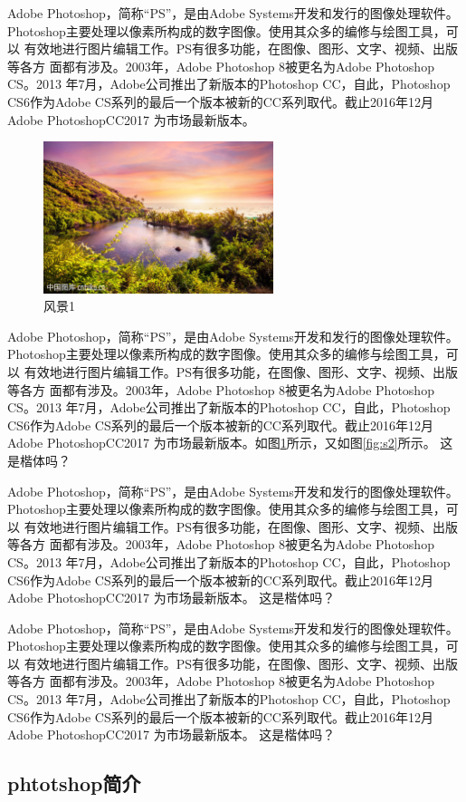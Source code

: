   Adobe Photoshop，简称“PS”，是由Adobe Systems开发和发行的图像处理软件。
 Photoshop主要处理以像素所构成的数字图像。使用其众多的编修与绘图工具，可以
 有效地进行图片编辑工作。PS有很多功能，在图像、图形、文字、视频、出版等各方
 面都有涉及。2003年，Adobe Photoshop 8被更名为Adobe Photoshop CS。2013
 年7月，Adobe公司推出了新版本的Photoshop CC，自此，Photoshop CS6作为Adobe
 CS系列的最后一个版本被新的CC系列取代。截止2016年12月Adobe PhotoshopCC2017
 为市场最新版本。
	\begin{figure}[!ht]
		\begin{center}
		\setlength{\belowcaptionskip}{10pt}
		\includegraphics[width=0.6\textwidth]{images/img1.jpg}
		\caption{风景1}\label{fig:s1}
		\end{center}
	\end{figure}
  Adobe Photoshop，简称“PS”，是由Adobe Systems开发和发行的图像处理软件。
 Photoshop主要处理以像素所构成的数字图像。使用其众多的编修与绘图工具，可以
 有效地进行图片编辑工作。PS有很多功能，在图像、图形、文字、视频、出版等各方
 面都有涉及。2003年，Adobe Photoshop 8被更名为Adobe Photoshop CS。2013
 年7月，Adobe公司推出了新版本的Photoshop CC，自此，Photoshop CS6作为Adobe
 CS系列的最后一个版本被新的CC系列取代。截止2016年12月Adobe PhotoshopCC2017
 为市场最新版本。如图\ref{fig:s1}所示，又如图\ref{fig:s2}所示。
 {\kaishu 这是楷体吗？}
 
  Adobe Photoshop，简称“PS”，是由Adobe Systems开发和发行的图像处理软件。
 Photoshop主要处理以像素所构成的数字图像。使用其众多的编修与绘图工具，可以
 有效地进行图片编辑工作。PS有很多功能，在图像、图形、文字、视频、出版等各方
 面都有涉及。2003年，Adobe Photoshop 8被更名为Adobe Photoshop CS。2013
 年7月，Adobe公司推出了新版本的Photoshop CC，自此，Photoshop CS6作为Adobe
 CS系列的最后一个版本被新的CC系列取代。截止2016年12月Adobe PhotoshopCC2017
 为市场最新版本。
 {\kaishu 这是楷体吗？}
 
  Adobe Photoshop，简称“PS”，是由Adobe Systems开发和发行的图像处理软件。
 Photoshop主要处理以像素所构成的数字图像。使用其众多的编修与绘图工具，可以
 有效地进行图片编辑工作。PS有很多功能，在图像、图形、文字、视频、出版等各方
 面都有涉及。2003年，Adobe Photoshop 8被更名为Adobe Photoshop CS。2013
 年7月，Adobe公司推出了新版本的Photoshop CC，自此，Photoshop CS6作为Adobe
 CS系列的最后一个版本被新的CC系列取代。截止2016年12月Adobe PhotoshopCC2017
 为市场最新版本。
 {\kaishu 这是楷体吗？}
 
\subsection{phtotshop简介}
 \newpage